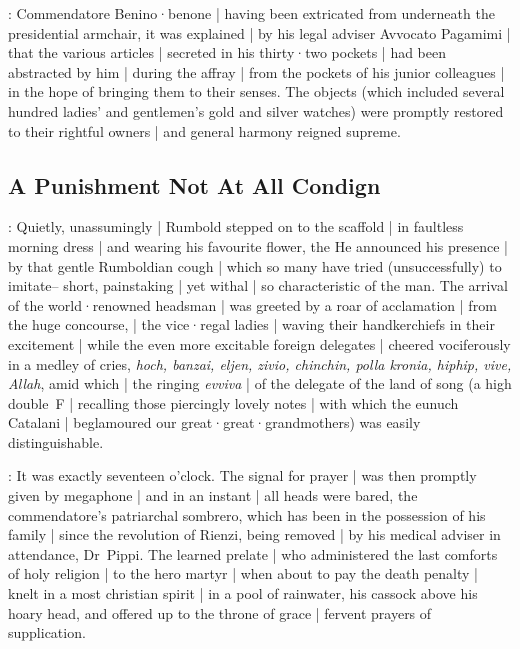 :
Commendatore Benino·benone |
having been extricated from underneath the presidential armchair,
it was explained |
by his legal adviser Avvocato Pagamimi |
that the various articles |
secreted in his thirty·two pockets |
had been abstracted by him |
during the affray |
from the pockets of his junior colleagues |
in the hope of bringing them to their senses.
The objects
(which included several hundred ladies' and gentlemen's gold and silver watches)
were promptly restored to their rightful owners |
and general harmony reigned supreme.


\subsection*{A Punishment Not At All Condign}

:
Quietly, unassumingly |
Rumbold stepped on to the scaffold |
in faultless morning dress |
and wearing his favourite flower,
the 
He announced his presence |
by that gentle Rumboldian cough |
which so many have tried (unsuccessfully) to imitate--%
short,
painstaking |
yet withal |
so characteristic of the man.
The arrival of the world·renowned headsman |
was greeted by a roar of acclamation |
from the huge concourse, |
the vice·regal ladies |
waving their handkerchiefs in their excitement |
while the even more excitable foreign delegates |
cheered vociferously in a medley of cries,
\emph{hoch,
banzai,
eljen,
zivio,
chinchin,
polla kronia,
hiphip,
vive,
Allah},
amid which |
the ringing \emph{evviva} |
of the delegate of the land of song
(a high double~F |
recalling those piercingly lovely notes |
with which the eunuch Catalani |
beglamoured our great·great·grandmothers)
was easily distinguishable.

:
It was exactly seventeen o'clock.
The signal for prayer |
was then promptly given by megaphone |
and in an instant |
all heads were bared,
the commendatore's patriarchal sombrero,
which has been in the possession of his family |
since the revolution of Rienzi,
being removed |
by his medical adviser in attendance,
Dr~Pippi.
The learned prelate |
who administered the last comforts of holy religion |
to the hero martyr |
when about to pay the death penalty
 |
knelt in a most christian spirit |
in a pool of rainwater,
his cassock above his hoary head,
and offered up to the throne of grace |
fervent prayers of supplication.

